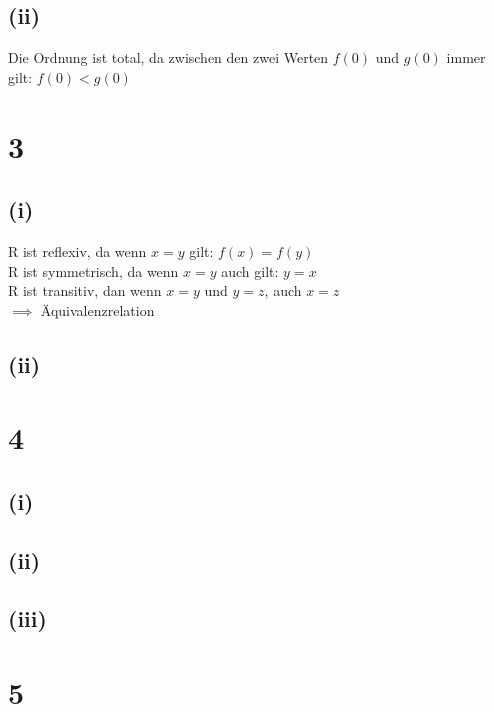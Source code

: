 \documentclass{article}
\begin{document}
\subsection{(ii)}
Die Ordnung ist total, da zwischen den zwei Werten $f(0)$ und $g(0)$ immer gilt: $f(0) < g(0)$

\section{3}
\subsection{(i)}
R ist reflexiv, da wenn $x = y$ gilt: $f(x) = f(y)$ \\
R ist symmetrisch, da wenn $x = y$ auch gilt: $y = x$ \\
R ist transitiv, dan wenn $x = y$ und $y = z$, auch $x = z$ \\
$\implies$ Äquivalenzrelation
\subsection{(ii)}

\section{4}
\subsection{(i)}
\subsection{(ii)}
\subsection{(iii)}

\section{5}
\end{document}
